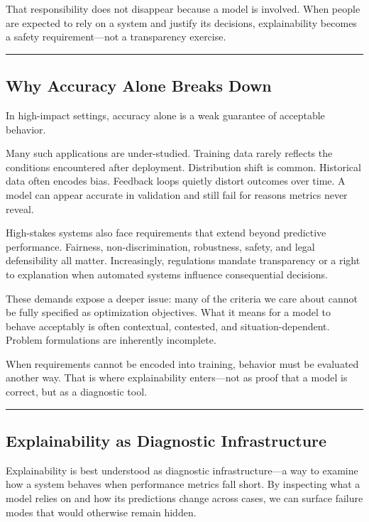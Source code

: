 \documentclass[
  letterpaper,
  DIV=11,
  numbers=noendperiod]{scrartcl}
\begin{document}
That responsibility does not disappear because a model is involved. When
people are expected to rely on a system and justify its decisions,
explainability becomes a safety requirement---not a transparency
exercise.

\begin{center}\rule{0.5\linewidth}{0.5pt}\end{center}

\subsection{Why Accuracy Alone Breaks
Down}\label{why-accuracy-alone-breaks-down}

In high-impact settings, accuracy alone is a weak guarantee of
acceptable behavior.

Many such applications are under-studied. Training data rarely reflects
the conditions encountered after deployment. Distribution shift is
common. Historical data often encodes bias. Feedback loops quietly
distort outcomes over time. A model can appear accurate in validation
and still fail for reasons metrics never reveal.

High-stakes systems also face requirements that extend beyond predictive
performance. Fairness, non-discrimination, robustness, safety, and legal
defensibility all matter. Increasingly, regulations mandate transparency
or a right to explanation when automated systems influence consequential
decisions.

These demands expose a deeper issue: many of the criteria we care about
cannot be fully specified as optimization objectives. What it means for
a model to behave acceptably is often contextual, contested, and
situation-dependent. Problem formulations are inherently incomplete.

When requirements cannot be encoded into training, behavior must be
evaluated another way. That is where explainability enters---not as
proof that a model is correct, but as a diagnostic tool.

\begin{center}\rule{0.5\linewidth}{0.5pt}\end{center}

\subsection{Explainability as Diagnostic
Infrastructure}\label{explainability-as-diagnostic-infrastructure}

Explainability is best understood as diagnostic infrastructure---a way
to examine how a system behaves when performance metrics fall short. By
inspecting what a model relies on and how its predictions change across
cases, we can surface failure modes that would otherwise remain hidden.
\end{document}
